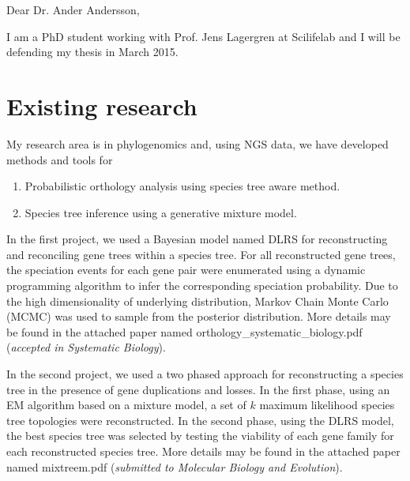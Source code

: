 \documentclass[margin, 10pt] {report}
\begin{document}
\noindent
Dear Dr. Ander Andersson,

\noindent
I am a PhD student working with Prof. Jens Lagergren at Scilifelab and I will be defending my thesis in March 2015. 

\section*{Existing research}
My research area is in phylogenomics and, using NGS data, we have developed methods and tools for 
\begin{enumerate}
\item Probabilistic orthology analysis using species tree aware method. 
\item Species tree inference using a generative mixture model. 
\end{enumerate}

In the first project, we used a Bayesian model named DLRS for reconstructing and reconciling gene trees within a species tree. 
For all reconstructed gene trees, the speciation events for each gene pair were enumerated using a dynamic programming algorithm to infer the corresponding speciation probability. Due to the high dimensionality of underlying distribution, Markov Chain Monte Carlo (MCMC) was used to sample from the posterior distribution. More details may be found in the attached paper named orthology\_systematic\_biology.pdf (\textit{accepted in Systematic Biology}).

In the second project, we used a two phased approach for reconstructing a species tree in the presence of gene duplications and losses. 
In the first phase, using an EM algorithm based on a mixture model, a set of $k$ maximum likelihood species tree topologies were reconstructed. 
In the second phase, using the DLRS model, the best species tree was selected by testing the viability of each gene family for each reconstructed species tree. More details may be found in the attached paper named mixtreem.pdf (\textit{submitted to Molecular Biology and Evolution}). 
\end{document}
